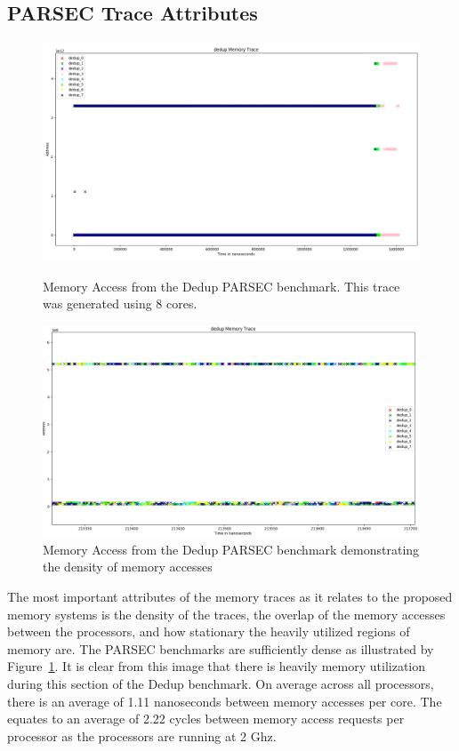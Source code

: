 \subsection{PARSEC Trace Attributes}

\begin{figure}[htbp]
		\includegraphics[width=\linewidth]{fig/dedup_whole.png}
		\caption{Memory Access from the Dedup PARSEC benchmark. This trace was generated using 8 cores.}
		\label{fig:dedup_whole}
		\includegraphics[width=\linewidth]{fig/dedup_dense.png}
		\caption{Memory Access from the Dedup PARSEC benchmark demonstrating the density of memory accesses}
		\label{fig:dedup_dense}
\end{figure}

The most important attributes of the memory traces as it relates to the proposed memory systems is the density of the traces, the overlap of the memory accesses between the processors, and how stationary the heavily utilized regions of memory are. The PARSEC benchmarks are sufficiently dense as illustrated by Figure~\ref{fig:dedup_dense}. It is clear from this image that there is heavily memory utilization during this section of the Dedup benchmark. On average across all processors, there is an average of 1.11 nanoseconds between memory accesses per core. The equates to an average of 2.22 cycles between memory access requests per processor as the processors are running at 2 Ghz. 


